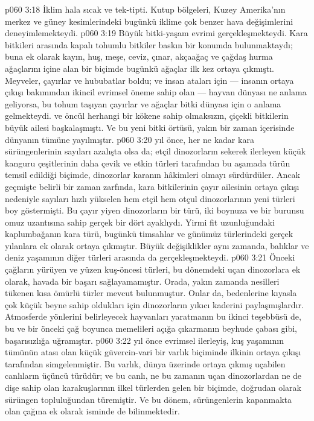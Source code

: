 \vs p060 3:18 İklim hala sıcak ve tek\hyp{}tipti. Kutup bölgeleri, Kuzey Amerika’nın merkez ve güney kesimlerindeki bugünkü iklime çok benzer hava değişimlerini deneyimlemekteydi.
\vs p060 3:19 Büyük bitki\hyp{}yaşam evrimi gerçekleşmekteydi. Kara bitkileri arasında kapalı tohumlu bitkiler baskın bir konumda bulunmaktaydı; buna ek olarak kayın, huş, meşe, ceviz, çınar, akçaağaç ve çağdaş hurma ağaçlarını içine alan bir biçimde bugünkü ağaçlar ilk kez ortaya çıkmıştı. Meyveler, çayırlar ve hububatlar boldu; ve insan ataları için --- insanın ortaya çıkışı bakımından ikincil evrimsel öneme sahip olan --- hayvan dünyası ne anlama geliyorsa, bu tohum taşıyan çayırlar ve ağaçlar bitki dünyası için o anlama gelmekteydi.  ve öncül herhangi bir kökene sahip olmaksızın, çiçekli bitkilerin büyük ailesi başkalaşmıştı. Ve bu yeni bitki örtüsü, yakın bir zaman içerisinde dünyanın tümüne yayılmıştır.
\vs p060 3:20  yıl önce, her ne kadar kara sürüngenlerinin sayıları azalışta olsa da; etçil dinozorların sekerek ilerleyen küçük kanguru çeşitlerinin daha çevik ve etkin türleri tarafından bu aşamada türün temsil edildiği biçimde, dinozorlar karanın hâkimleri olmayı sürdürdüler. Ancak geçmişte belirli bir zaman zarfında, kara bitkilerinin çayır ailesinin ortaya çıkışı nedeniyle sayıları hızlı yükselen hem etçil hem otçul dinozorlarının yeni türleri boy göstermişti. Bu çayır yiyen dinozorların bir türü, iki boynuza ve bir burunsu omuz uzantısına sahip gerçek bir dört ayaklıydı. Yirmi fit uzunluğundaki kaplumbağanın kara türü, bugünkü timsahlar ve günümüz türlerindeki gerçek yılanlara ek olarak ortaya çıkmıştır. Büyük değişiklikler aynı zamanda, balıklar ve deniz yaşamının diğer türleri arasında da gerçekleşmekteydi.
\vs p060 3:21 Önceki çağların yürüyen ve yüzen kuş\hyp{}öncesi türleri, bu dönemdeki uçan dinozorlara ek olarak, havada bir başarı sağlayamamıştır. Orada, yakın zamanda nesilleri tükenen kısa ömürlü türler mevcut bulunmuştur. Onlar da, bedenlerine kıyasla çok küçük beyne sahip oldukları için dinozorların yıkıcı kaderini paylaşmışlardır. Atmosferde yönlerini belirleyecek hayvanları yaratmanın bu ikinci teşebbüsü de, bu ve bir önceki çağ boyunca memelileri açığa çıkarmanın beyhude çabası gibi, başarısızlığa uğramıştır.
\vs p060 3:22  yıl önce evrimsel ilerleyiş, kuş yaşamının tümünün atası olan küçük güvercin\hyp{}vari bir varlık biçiminde  ilkinin  ortaya çıkışı tarafından simgelenmiştir. Bu varlık, dünya üzerinde ortaya çıkmış uçabilen canlıların üçüncü türüdür; ve bu canlı, ne bu zamanın uçan dinozorlardan ne de dişe sahip olan karakuşlarının ilkel türlerden gelen bir biçimde, doğrudan olarak sürüngen topluluğundan türemiştir. Ve bu dönem, sürüngenlerin kapanmakta olan çağına ek olarak  isminde de bilinmektedir.
